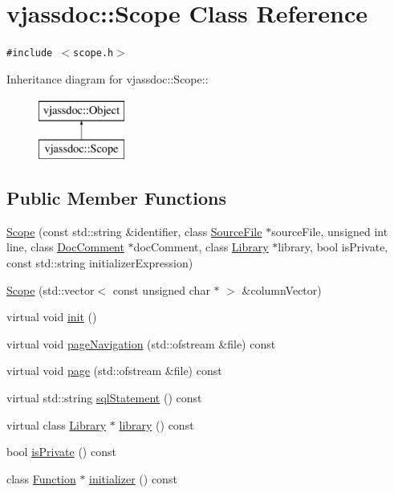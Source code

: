 \hypertarget{classvjassdoc_1_1Scope}{
\section{vjassdoc::Scope Class Reference}
\label{classvjassdoc_1_1Scope}
}
{\tt \#include $<$scope.h$>$}

Inheritance diagram for vjassdoc::Scope::\begin{figure}[H]
\begin{center}
\leavevmode
\includegraphics[height=2cm]{classvjassdoc_1_1Scope}
\end{center}
\end{figure}
\subsection*{Public Member Functions}
\begin{CompactItemize}
\item 
\hyperlink{classvjassdoc_1_1Scope_93e1a8c864401dcb118123b8c1c862d8}{Scope} (const std::string \&identifier, class \hyperlink{classvjassdoc_1_1SourceFile}{SourceFile} $\ast$sourceFile, unsigned int line, class \hyperlink{classvjassdoc_1_1DocComment}{DocComment} $\ast$docComment, class \hyperlink{classvjassdoc_1_1Library}{Library} $\ast$library, bool isPrivate, const std::string initializerExpression)
\item 
\hyperlink{classvjassdoc_1_1Scope_08fa49b1daca27363032265465005dc0}{Scope} (std::vector$<$ const unsigned char $\ast$ $>$ \&columnVector)
\item 
virtual void \hyperlink{classvjassdoc_1_1Scope_fb5915ecd0cabc72508e7b7a09f0ef5c}{init} ()
\item 
virtual void \hyperlink{classvjassdoc_1_1Scope_3fac1b4e0201e20463acfc5f0f0e93b8}{pageNavigation} (std::ofstream \&file) const 
\item 
virtual void \hyperlink{classvjassdoc_1_1Scope_2a37c9d88da6a8c7c95d4f0e5b88ccbb}{page} (std::ofstream \&file) const 
\item 
virtual std::string \hyperlink{classvjassdoc_1_1Scope_634ae4bc06389b21ef8612795d4a910f}{sqlStatement} () const 
\item 
virtual class \hyperlink{classvjassdoc_1_1Library}{Library} $\ast$ \hyperlink{classvjassdoc_1_1Scope_4d9d486897a1960cff057ab88a43fb15}{library} () const 
\item 
bool \hyperlink{classvjassdoc_1_1Scope_c2b7a4d2f0a0e248194d9e96c3d00f10}{isPrivate} () const 
\item 
class \hyperlink{classvjassdoc_1_1Function}{Function} $\ast$ \hyperlink{classvjassdoc_1_1Scope_33866d7c3eac290c01e57e1919b26cda}{initializer} () const 
\end{CompactItemize}


